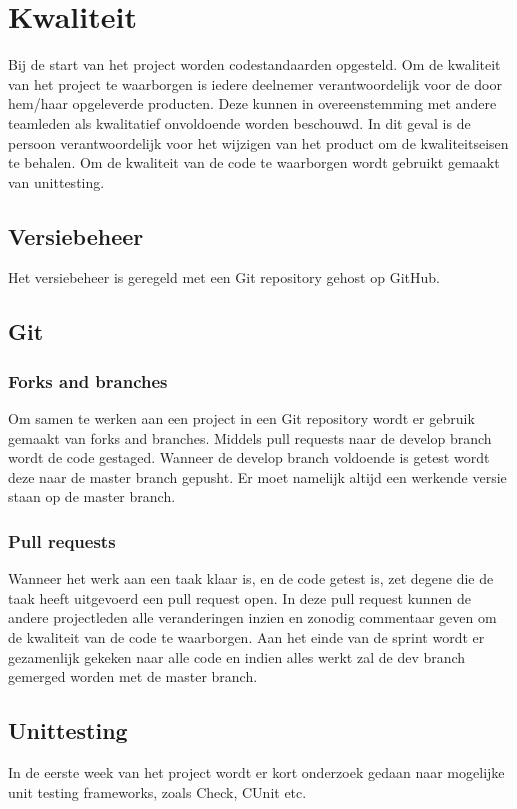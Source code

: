 \section{Kwaliteit}
Bij de start van het project worden codestandaarden opgesteld. Om de kwaliteit
van het project te waarborgen is iedere deelnemer verantwoordelijk voor de door
hem/haar opgeleverde producten. Deze kunnen in overeenstemming met andere
teamleden als kwalitatief onvoldoende worden beschouwd. In dit geval is de
persoon verantwoordelijk voor het wijzigen van het product om de kwaliteitseisen
te behalen. Om de kwaliteit van de code te waarborgen wordt gebruikt gemaakt van
unittesting.

\subsection{Versiebeheer}
\label{sec:versiebeheer}

Het versiebeheer is geregeld met een Git repository gehost op GitHub.

\subsection{Git}
\subsubsection{Forks and branches}
Om samen te werken aan een project in een Git repository wordt er gebruik
gemaakt van forks and branches. Middels pull requests naar de develop branch
wordt de code gestaged. Wanneer de develop branch voldoende is getest wordt
deze naar de master branch gepusht. Er moet namelijk altijd een werkende versie
staan op de master branch.

\subsubsection{Pull requests}
Wanneer het werk aan een taak klaar is, en de code getest is, zet degene die de
taak heeft uitgevoerd een pull request open. In deze pull request kunnen de andere
projectleden alle veranderingen inzien en zonodig commentaar geven om de kwaliteit
van de code te waarborgen.
Aan het einde van de sprint wordt er gezamenlijk gekeken naar alle code
en indien alles werkt zal de dev branch gemerged worden met de master branch.

\subsection{Unittesting}
In de eerste week van het project wordt er kort onderzoek gedaan naar mogelijke
unit testing frameworks, zoals Check, CUnit etc.

